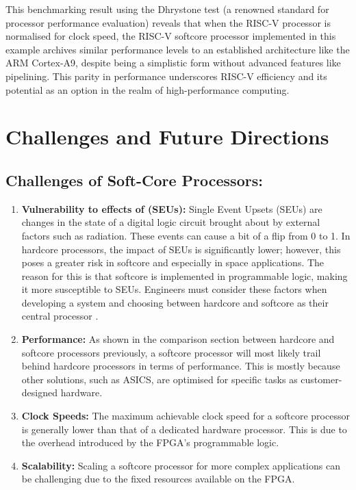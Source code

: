 \documentclass[conference]{IEEEtran}
\begin{document}
This benchmarking result using the Dhrystone test (a renowned standard for processor performance evaluation) reveals that when the RISC-V processor is normalised for clock speed, the RISC-V softcore processor implemented in this example archives similar performance levels to an established architecture like the ARM Cortex-A9, despite being a simplistic form without advanced features like pipelining. This parity in performance underscores RISC-V efficiency and its potential as an option in the realm of high-performance computing.


\newpage
\section{ Challenges and Future Directions}
\subsection{Challenges of Soft-Core Processors:}
\begin{enumerate}
    \item \textbf{Vulnerability to effects of (SEUs):} Single Event Upsets (SEUs) are changes in the state of a digital logic circuit brought about by external factors such as radiation. These events can cause a bit of a flip from 0 to 1. In hardcore processors, the impact of SEUs is significantly lower; however, this poses a greater risk in softcore and especially in space applications. The reason for this is that softcore is implemented in programmable logic, making it more susceptible to SEUs. Engineers must consider these factors when developing a system and choosing between hardcore and softcore as their central processor \cite{14}.
    \item \textbf{Performance:} As shown in the comparison section between hardcore and softcore processors previously, a softcore processor will most likely trail behind hardcore processors in terms of performance. This is mostly because other solutions, such as ASICS, are optimised for specific tasks as customer-designed hardware.
    \item \textbf{Clock Speeds:}  The maximum achievable clock speed for a softcore processor is generally lower than that of a dedicated hardware processor. This is due to the overhead introduced by the FPGA's programmable logic.
      \item \textbf{Scalability:} Scaling a softcore processor for more complex applications can be challenging due to the fixed resources available on the FPGA.
\end{enumerate}
\end{document}
